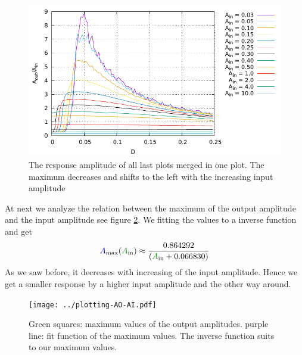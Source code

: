 \documentclass[10pt,fleqn,%
reqno,a4paper]{article}
\makeatletter
\def\mathcolor#1#{\@mathcolor{#1}}
\def\@mathcolor#1#2#3{%
        \protect\leavevmode
        \begingroup\color#1{#2}#3\endgroup
}
\newcommand{\nA}{\mathcolor{blue!70!black}{A}}
\newcommand{\mA}{\mathcolor{green!50!black}{A}}
\makeatother
\begin{document}
\begin{figure}[htp!]
	\begin{center}
		\includegraphics[width=\linewidth]{gnuplot_pictures/plotting-A-D-all.pdf} 
		\caption{The response amplitude of all last plots merged in one plot. The maximum decreases and shifts to the left with the increasing input amplitude} 
		\label{fig:all-A-D}
	\end{center}
\end{figure}

At next we analyze the relation between the maximum of the output amplitude and the input amplitude see figure \ref{fig:max-AO-AI}. We fitting the values to a inverse function and get
\begin{align}
	\nA_{\mathrm{max}}(\mA _{\mathrm{in}}) \approx  \frac{0.864292}{(\mA _{\mathrm{in}}+0.066830)}
\end{align}
As we saw before, it decreases with increasing of the input amplitude. Hence we get a smaller response by a higher input amplitude and the other way around.  

\begin{figure}[htp!]
	\begin{center}
		\texttt{[image: ../plotting-AO-AI.pdf]} %
		\caption{Green squares: maximum values of the output amplitudes. purple line: fit function of the maximum values. The inverse function suits to our maximum values. } 
		\label{fig:max-AO-AI}
	\end{center}
\end{figure}
\end{document}

